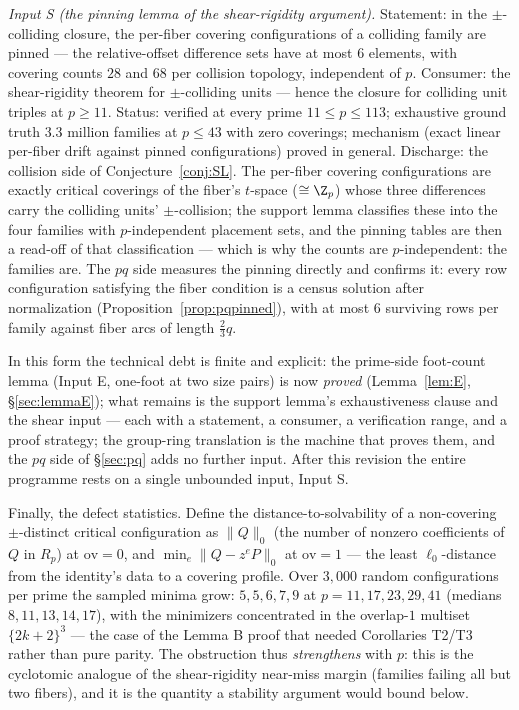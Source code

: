 \emph{Input S (the pinning lemma of the shear-rigidity argument).}
Statement: in the $\pm$-colliding closure, the per-fiber covering
configurations of a colliding family are pinned --- the relative-offset
difference sets have at most $6$ elements, with covering counts $28$ and
$68$ per collision topology, independent of $p$. Consumer: the
shear-rigidity theorem for $\pm$-colliding units --- hence the closure for
colliding unit triples at $p\ge11$. Status: verified at every prime
$11\le p\le113$; exhaustive ground truth $3.3$ million families at $p\le43$
with zero coverings; mechanism (exact linear per-fiber drift against
pinned configurations) proved in general. Discharge: the collision side of
Conjecture~\ref{conj:SL}. The per-fiber covering configurations are exactly
critical coverings of the fiber's $t$-space ($\cong\Z_p$) whose three
differences carry the colliding units' $\pm$-collision; the support lemma
classifies these into the four families with $p$-independent placement
sets, and the pinning tables are then a read-off of that classification ---
which is why the counts are $p$-independent: the families are. The $pq$
side measures the pinning directly and confirms it: every row configuration
satisfying the fiber condition is a census solution after normalization
(Proposition~\ref{prop:pqpinned}), with at most $6$ surviving rows per
family against fiber arcs of length $\tfrac23 q$.

In this form the technical debt is finite and explicit: the prime-side
foot-count lemma (Input E, one-foot at two size pairs) is now \emph{proved}
(Lemma~\ref{lem:E}, \S\ref{sec:lemmaE}); what remains is the support
lemma's exhaustiveness clause and the shear input --- each with a
statement, a consumer, a verification range, and a proof strategy; the
group-ring translation is the machine that proves them, and the $pq$ side
of \S\ref{sec:pq} adds no further input. After this revision the entire
programme rests on a single unbounded input, Input S.

\medskip
Finally, the defect statistics. Define the distance-to-solvability of a
non-covering $\pm$-distinct critical configuration as $\|Q\|_{0}$ (the
number of nonzero coefficients of $Q$ in $R_p$) at $\mathrm{ov}=0$, and
$\min_e\|Q-z^eP\|_{0}$ at $\mathrm{ov}=1$ --- the least $\ell_0$-distance
from the identity's data to a covering profile. Over $3{,}000$ random
configurations per prime the sampled minima grow: $5,5,6,7,9$ at
$p=11,17,23,29,41$ (medians $8,11,13,14,17$), with the minimizers
concentrated in the overlap-$1$ multiset $\{2k{+}2\}^3$ --- the case of the
Lemma B proof that needed Corollaries T2/T3 rather than pure parity. The
obstruction thus \emph{strengthens} with $p$: this is the cyclotomic
analogue of the shear-rigidity near-miss margin (families failing all but
two fibers), and it is the quantity a stability argument would bound below.

